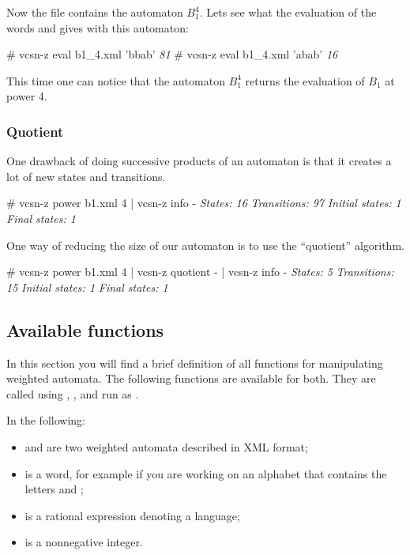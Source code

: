 Now the file  contains the automaton $B_1^4$. Lets see
what the evaluation of the words  and  gives
with this automaton:

\begin{shell}
# vcsn-z eval b1_4.xml 'bbab'
\textit{81}
# vcsn-z eval b1_4.xml 'abab'
\textit{16}
\end{shell}

This time one can notice that the automaton $B_1^4$ returns the
evaluation of $B_1$ at power 4.

\subsubsection{Quotient}

One drawback of doing successive products of an automaton is
that it creates a lot of new states and transitions.
\begin{shell}
# vcsn-z power b1.xml 4 | vcsn-z info -
\textit{States: 16}
\textit{Transitions: 97}
\textit{Initial states: 1}
\textit{Final states: 1}
\end{shell}
One way of reducing the size of our automaton is to use the
``quotient'' algorithm.
\begin{shell}
# vcsn-z power b1.xml 4 | vcsn-z quotient - | vcsn-z info -
\textit{States: 5}
\textit{Transitions: 15}
\textit{Initial states: 1}
\textit{Final states: 1}
\end{shell}

\subsection{Available functions}
In this section you will find a brief definition of all functions for
manipulating weighted automata. The following functions are available
for both.  They are called using ,
, and  run as
  .

\smallskip

In the following:

\begin{itemize}
\item {} and  are two weighted automata
  described in \Vauc XML format;
\item {} is a word, for example  if you are working on
  an alphabet that contains the letters  and ;
\item {} is a rational expression denoting a language;
\item {} is a nonnegative integer.
\end{itemize}
\newpage

